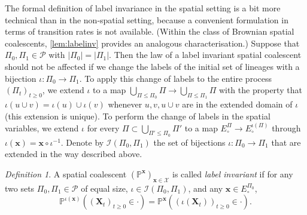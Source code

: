 \documentclass[reqno,draft]{amsart}
\numberwithin{equation}{section}
\theoremstyle{plain}
\theoremstyle{remark}
\newtheorem{definition}[theorem]{Definition}
\renewcommand{\P}{\mathbb{P}} %
\newcommand{\fpart}{\Pi} %
\newcommand{\rates}{R^\circ} %
\newcommand{\nurates}{R} %
\newcommand{\labelinv}{\mathcal{I}} %
\begin{document}
The formal definition of label invariance in the spatial setting is a bit more technical than in the non-spatial setting, because a convenient formulation in terms of transition rates is not available. (Within the class of Brownian spatial coalescents, \cref{lem:labelinv} provides an analogous characterisation.) Suppose that $\fpart_0,\fpart_1 \in \mathcal{P}$ with $|\fpart_0| = |\fpart_1|$. Then the law of a label invariant spatial coalescent should not be affected if we change the labels of the initial set of lineages with a bijection $\iota\colon \fpart_0 \to \fpart_1$. To apply this change of labels to the entire process $(\fpart_t)_{t\ge 0}$, we extend $\iota$ to a map $\bigcup_{\fpart \le \fpart_0} \fpart \to \bigcup_{\fpart \le \fpart_1} \fpart$ with the property that $\iota(u \cup v) = \iota(u) \cup \iota(v)$ whenever $u,v,u\cup v$ are in the extended domain of $\iota$ (this extension is unique). To perform the change of labels in the spatial variables, we extend $\iota$ for every $\fpart \subset \bigcup_{\fpart' \le \fpart_0} \fpart'$ to a map $E^\fpart_\circ  \to E^{\iota(\fpart)}_\circ $ through $\iota(\boldsymbol x) = \boldsymbol x \circ \iota ^{-1}$. Denote by $\labelinv(\fpart_0,\fpart_1)$ the set of bijections $\iota\colon \fpart_0 \to \fpart_1$ that are extended %
in the way described above. %

\begin{definition}\label{def:labelinv}
    A spatial coalescent $(\P^{\boldsymbol x})_{\boldsymbol x\in \mathcal{X}}$ is called \emph{label invariant} if for any two sets $\fpart_0,\fpart_1 \in \mathcal{P}$ of equal size, $\iota \in \labelinv(\fpart_0,\fpart_1)$, and any $\boldsymbol x \in E^{\fpart_0}_\circ $,
    \begin{equation}\label{eq:labelinv}
        \P^{\iota(\boldsymbol x)}((\boldsymbol X_t)_{t \ge 0} \in \cdot ) = \P^{\boldsymbol x}((\iota(\boldsymbol X_t))_{t \ge 0} \in \cdot ).
    \end{equation}
\end{definition}


\end{document}
